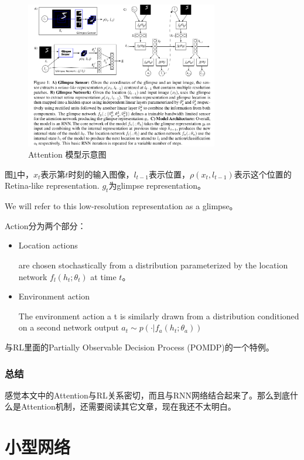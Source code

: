 \begin{figure}[!htbp]
\centering
\includegraphics[width=0.75\textwidth]{DLTips/Attention0.png}
\caption{Attention 模型示意图}
\label{Attention0}
\end{figure}

图\ref{Attention0}中，$x_t$表示第$t$时刻的输入图像，$l_{t-1}$表示位置，$\rho (x_t, l_{t-1})$表示这个位置的Retina-like representation. $g_t$为glimpse representation。 

We will refer to this low-resolution representation
as a glimpse。

Action分为两个部分：
\begin{itemize}
\item Location actions

are chosen stochastically from a distribution parameterized by the location network $f_l(h_t; \theta_t)$ at time $t$。

\item Environment action

The environment action a t is similarly drawn from a distribution conditioned
on a second network output $a_t \sim p(\cdot | f_a(h_t; \theta_a))$

\end{itemize}

与RL里面的Partially Observable Decision Process (POMDP)的一个特例。

\subsubsection{总结}

感觉本文中的Attention与RL关系密切，而且与RNN网络结合起来了。那么到底什么是Attention机制，还需要阅读其它文章，现在我还不太明白。


\section{小型网络}

